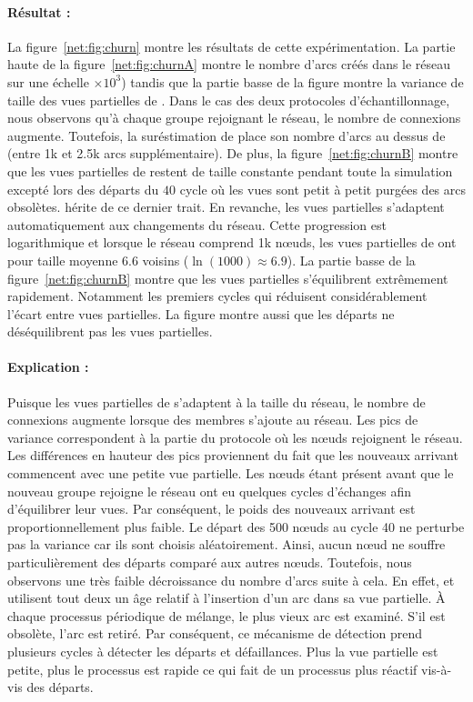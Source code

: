 \paragraph{Résultat :} La figure~\ref{net:fig:churn} montre les résultats de
cette expérimentation. La partie haute de la figure~\ref{net:fig:churnA} montre
le nombre d'arcs créés dans le réseau sur une échelle $\times 10^3$) tandis que
la partie basse de la figure montre la variance de taille des vues partielles de
\SPRAY. Dans le cas des deux protocoles d'échantillonnage, nous observons qu'à
chaque groupe rejoignant le réseau, le nombre de connexions augmente. Toutefois,
la suréstimation de \CYCLON place son nombre d'arcs au dessus de \SPRAY (entre
1k et 2.5k arcs supplémentaire). De plus, la figure~\ref{net:fig:churnB} montre
que les vues partielles de \CYCLON restent de taille constante pendant toute la
simulation excepté lors des départs du $40$ cycle où les vues sont petit
à petit purgées des arcs obsolètes. \SPRAY hérite de ce dernier trait. En
revanche, les vues partielles s'adaptent automatiquement aux changements du
réseau. Cette progression est logarithmique et lorsque le réseau comprend 1k
nœuds, les vues partielles de \SPRAY ont pour taille moyenne 6.6 voisins
($\ln(1000)\approx6.9$). La partie basse de la figure~\ref{net:fig:churnB}
montre que les vues partielles s'équilibrent extrêmement rapidement. Notamment
les premiers cycles qui réduisent considérablement l'écart entre vues
partielles. La figure montre aussi que les départs ne déséquilibrent pas les
vues partielles.

\paragraph{Explication :} Puisque les vues partielles de \SPRAY s'adaptent à la
taille du réseau, le nombre de connexions augmente lorsque des membres s'ajoute
au réseau. Les pics de variance correspondent à la partie du protocole où les
nœuds rejoignent le réseau. Les différences en hauteur des pics proviennent du
fait que les nouveaux arrivant commencent avec une petite vue partielle. Les
nœuds étant présent avant que le nouveau groupe rejoigne le réseau ont eu
quelques cycles d'échanges afin d'équilibrer leur vues. Par conséquent, le poids
des nouveaux arrivant est proportionnellement plus faible. Le départ des 500
nœuds au cycle 40 ne perturbe pas la variance car ils sont choisis
aléatoirement. Ainsi, aucun nœud ne souffre particulièrement des départs comparé
aux autres nœuds. Toutefois, nous observons une très faible décroissance du
nombre d'arcs suite à cela. En effet, \CYCLON et \SPRAY utilisent tout deux un
âge relatif à l'insertion d'un arc dans sa vue partielle. À chaque processus
périodique de mélange, le plus vieux arc est examiné. S'il est obsolète, l'arc
est retiré. Par conséquent, ce mécanisme de détection prend plusieurs cycles à
détecter les départs et défaillances. Plus la vue partielle est petite, plus le
processus est rapide ce qui fait de \SPRAY un processus plus réactif vis-à-vis
des départs.

